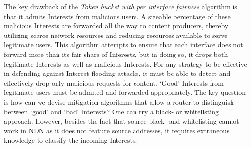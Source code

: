 


The key drawback of the {\it Token bucket with per interface fairness} algorithm is that it admits Interests from malicious users. A sizeable percentage of these malicious Interests are forwarded all the way to content producers, thereby utilizing scarce network resources and reducing resources available to serve legitimate users.  This algorithm attempts to ensure that each interface does not forward more than its fair share of Interests, but in doing so, it drops both legitimate Interests as well as malicious Interests. For any strategy to be effective in defending against Interest flooding attacks, it must be able to detect and effectively drop only malicious requests for content. `Good' Interests from legitimate users must be admited and forwarded appropriately. The key question is how can we devise mitigation algorithms that allow a router to distinguish between `good' and `bad' Interests? 
One can try a black- or whitelisting approach. However, besides the fact that source black- and whitelisting cannot work in NDN as it does not feature source addresses, it requires extraneous knowledge to classify the incoming Interests.





